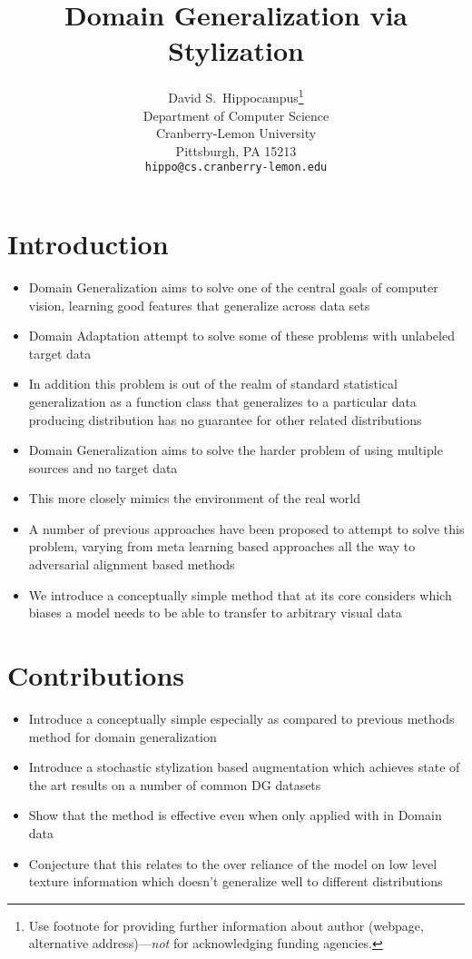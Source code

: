 \documentclass{article}
\title{Domain Generalization via Stylization}
\author{David S.~Hippocampus\thanks{Use footnote for providing further information
    about author (webpage, alternative address)---\emph{not} for acknowledging
    funding agencies.} \\
  Department of Computer Science\\
  Cranberry-Lemon University\\
  Pittsburgh, PA 15213 \\
  \texttt{hippo@cs.cranberry-lemon.edu} \\
}
\begin{document}
\maketitle


\section{Introduction}

\begin{itemize}
    \item Domain Generalization aims to solve one of the central goals of computer vision, learning good features that generalize across data sets
    \item Domain Adaptation attempt to solve some of these problems with unlabeled target data
    \item In addition this problem is out of the realm of standard statistical generalization as a function class that generalizes to a particular data producing distribution has no guarantee for other related distributions 
    \item Domain Generalization aims to solve the harder problem of using multiple sources and no target data
    \item This more closely mimics the environment of the real world
    \item A number of previous approaches have been proposed to attempt to solve this problem, varying from meta learning based approaches all the way to adversarial alignment based methods
    \item We introduce a conceptually simple method that at its core considers which biases a model needs to be able to transfer to arbitrary visual data
\end{itemize}

\section{Contributions}
\begin{itemize}
    \item Introduce a conceptually simple especially as compared to previous methods method for domain generalization
    \item Introduce a stochastic stylization based augmentation which achieves state of the art results on a number of common DG datasets
    \item Show that the method is effective even when only applied with in Domain data
    \item Conjecture that this relates to the over reliance of the model on low level texture information which doesn't generalize well to different distributions
\end{itemize}
\end{document}

